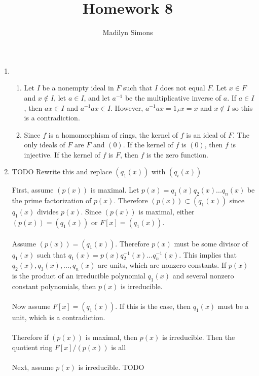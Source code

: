 \documentclass{article}
\title{Homework 8}
\author{Madilyn Simons}
\date{}
\begin{document}
\maketitle

\begin{enumerate}

\item
\begin{enumerate}

\item Let $I$ be a nonempty ideal in $F$ such that $I$ does not equal $F$.
Let $x \in F$ and $x \notin I$, let $a \in I$, and let $a^{-1}$ be the
multiplicative inverse of $a$.  If $a \in I$, then $ax \in I$ and
$a^{-1}ax \in I$.  However, $a^{-1}ax = 1_{F}x = x$ and $x \notin I$ so this
is a contradiction.

\item Since $f$ is a homomorphism of rings, the kernel of $f$ is an ideal
of $F$.  The only ideals of $F$ are $F$ and $(0)$.  If the kernel of
$f$ is $(0)$, then $f$ is injective.  If the kernel of $f$ is $F$, then
$f$ is the zero function.

\end{enumerate}

\item TODO Rewrite this and replace $(q_{1}(x))$ with $(q_{i}(x))$

First, assume $(p(x))$ is maximal.  Let
$p(x) = q_{1}(x)q_{2}(x) ... q_{n}(x)$ be the prime factorization of $p(x)$.
Therefore $(p(x)) \subset (q_{1}(x))$ since $q_{1}(x)$ divides $p(x)$.
Since $(p(x))$ is maximal, either $(p(x)) = (q_{1}(x))$ or $F[x] = (q_{1}(x))$.
\\ \\
Assume $(p(x)) = (q_{1}(x))$.  Therefore $p(x)$ must be some divisor of
$q_{1}(x)$ such that $q_{1}(x) = p(x)q_{2}^{-1}(x) ... q_{n}^{-1}(x)$.  This
implies that $q_{2}(x), q_{3}(x), ..., q_{n}(x)$ are units, which are nonzero
constants.  If $p(x)$ is the product of an irreducible polynomial $q_{1}(x)$
and several nonzero constant polynomials, then $p(x)$ is irreducible.
\\ \\
Now assume $F[x] = (q_{1}(x))$.  If this is the case, then $q_{1}(x)$ must
be a unit, which is a contradiction.
\\ \\
Therefore if $(p(x))$ is maximal, then $p(x)$ is irreducible.  Then the quotient
ring $F[x]/(p(x))$ is all
\\ \\
Next, assume $p(x)$ is irreducible.  TODO



\end{enumerate}
\end{document}
